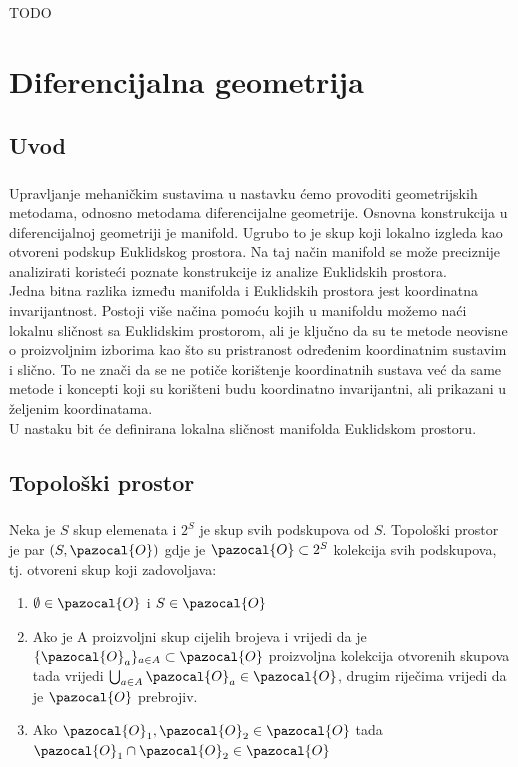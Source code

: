 \documentclass[times, utf8, diplomski]{fer}
\newcommand{\Oa}{\pazocal{O}}
\begin{document}
\paragraph{}
TODO

\newpage 
\clearpage

\chapter{Diferencijalna geometrija}

\section{Uvod}
	\paragraph{} Upravljanje mehaničkim sustavima u nastavku ćemo provoditi geometrijskih metodama, odnosno metodama diferencijalne geometrije. Osnovna konstrukcija u diferencijalnoj geometriji je manifold. Ugrubo to je skup koji lokalno izgleda kao otvoreni podskup Euklidskog prostora. Na taj način manifold se može preciznije analizirati koristeći poznate konstrukcije iz analize Euklidskih prostora. \\ 
	Jedna bitna razlika između manifolda i Euklidskih prostora jest koordinatna invarijantnost. Postoji više načina pomoću kojih u manifoldu možemo naći lokalnu sličnost sa Euklidskim prostorom, ali je ključno da su te metode neovisne o proizvoljnim izborima kao što su pristranost određenim koordinatnim sustavim i slično. To ne znači da se ne potiče korištenje koordinatnih sustava već da same metode i koncepti koji su korišteni budu koordinatno invarijantni, ali prikazani u željenim koordinatama. \\
	U nastaku bit će definirana lokalna sličnost manifolda Euklidskom prostoru.

\section{Topološki prostor}
	
	\paragraph{}Neka je $S$ skup elemenata i $2^S$ je skup svih podskupova od $S$. Topološki prostor je par $(S, \Oa)$ gdje je $\Oa\subset2^S$ kolekcija svih podskupova, tj. otvoreni skup koji zadovoljava:
	\begin{enumerate}
		\item $\emptyset \in \Oa$ i $S \in \Oa$ 
		
		\item Ako je A proizvoljni skup cijelih brojeva i vrijedi da je $\{ \Oa_{a} \}_{a\in A}\subset \Oa$ proizvoljna kolekcija otvorenih skupova tada vrijedi $\bigcup_{a\in A}\Oa_a\in \Oa$, drugim riječima vrijedi da je $\Oa$ prebrojiv.
		
		\item Ako $\Oa_1, \Oa_2 \in \Oa$ tada $\Oa_1 \cap \Oa_2 \in \Oa$
	\end{enumerate}
\end{document}

